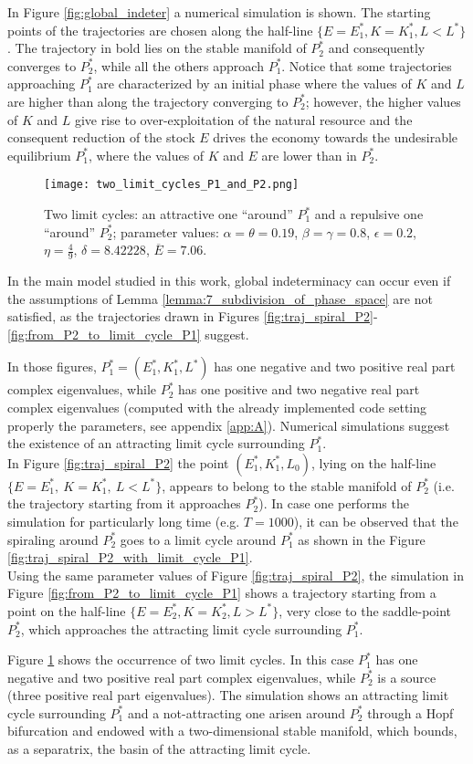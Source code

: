 In Figure \ref{fig:global_indeter} a numerical simulation is shown. The starting points of the trajectories are chosen along the half-line $\{E=E_1^*, K=K_1^*, L<L^*\}$. The trajectory in bold lies on the stable manifold of $P_2^*$ and consequently converges to $P_2^*$, while all the others approach $P_1^*$. Notice that some trajectories approaching $P_1^*$ are characterized by an initial phase where the values of $K$ and $L$ are higher than along the trajectory converging to $P_2^*$; however, the higher values of $K$ and $L$ give rise to over-exploitation of the natural resource and the consequent reduction of the stock $E$ drives the economy towards the undesirable equilibrium $P_1^*$, where the values of $K$ and $E$ are lower than in $P_2^*$.
\begin{figure}[h!]
	\centering
	\texttt{[image: two\_limit\_cycles\_P1\_and\_P2.png]}
	\caption{Two limit cycles: an attractive one “around” $P_1^*$ and a repulsive one “around” $P_2^*$; parameter values: $\alpha=\theta=0.19$, $\beta=\gamma=0.8$, $\epsilon=0.2$, $\eta=\frac{4}{9}$, $\delta=8.42228$, $\overline{E}=7.06$.}
	\label{fig:2_limit_cycles_P1_and_P2}
\end{figure}

In the main model studied in this work, global indeterminacy can occur even if the assumptions of Lemma \ref{lemma:7_subdivision_of_phase_space} are not satisfied, as the trajectories drawn in Figures \ref{fig:traj_spiral_P2}-\ref{fig:from_P2_to_limit_cycle_P1} suggest.

In those figures, $P_1^*=(E_1^*,K_1^*,L^*)$ has one negative and two positive real part complex eigenvalues, while $P_2^*$ has one positive and two negative real part complex eigenvalues (computed with the already implemented code setting properly the parameters, see appendix \ref{app:A}). Numerical simulations suggest the existence of an attracting limit cycle surrounding $P_1^*$. \\
In Figure \ref{fig:traj_spiral_P2} the
point $(E_1^*,K_1^*,L_0)$, lying on the half-line $\{E = E_1^*,\ K = K_1^*,\ L < L^*\}$, appears to belong to the stable manifold of $P_2^*$ (i.e. the trajectory starting from it approaches $P_2^*$). In case one performs the simulation for particularly long time (e.g. $T=1000$), it can be observed that the spiraling around $P_2^*$ goes to a limit cycle around $P_1^*$ as shown in the Figure \ref{fig:traj_spiral_P2_with_limit_cycle_P1}.\\
Using the same parameter values of Figure \ref{fig:traj_spiral_P2}, the simulation in Figure \ref{fig:from_P2_to_limit_cycle_P1} shows a trajectory starting from a point on the half-line $\{E = E_2^*, K = K_2^*, L > L^*\}$, very close to the saddle-point $P_2^*$, which approaches the attracting limit cycle surrounding $P_1^*$.

Figure \ref{fig:2_limit_cycles_P1_and_P2} shows the occurrence of two limit cycles. In this case $P_1^*$ has one negative and two positive real part complex eigenvalues, while $P_2^*$ is a source (three positive real part eigenvalues). The simulation shows an attracting limit cycle surrounding $P_1^*$ and a not-attracting one arisen around $P_2^*$ through a Hopf bifurcation and endowed with a two-dimensional stable manifold, which bounds, as a separatrix, the basin of the attracting limit cycle.